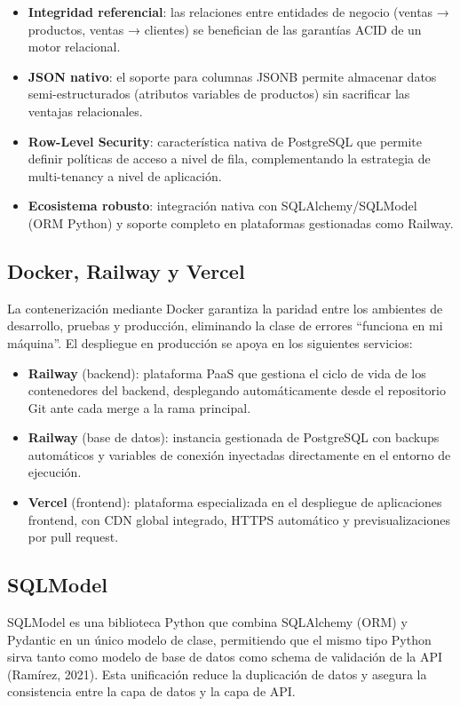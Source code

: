 \begin{itemize}
\tightlist
\item
  \textbf{Integridad referencial}: las relaciones entre entidades de negocio (ventas → productos, ventas → clientes) se benefician de las garantías ACID de un motor relacional.
\item
  \textbf{JSON nativo}: el soporte para columnas JSONB permite almacenar datos semi-estructurados (atributos variables de productos) sin sacrificar las ventajas relacionales.
\item
  \textbf{Row-Level Security}: característica nativa de PostgreSQL que permite definir políticas de acceso a nivel de fila, complementando la estrategia de multi-tenancy a nivel de aplicación.
\item
  \textbf{Ecosistema robusto}: integración nativa con SQLAlchemy/SQLModel (ORM Python) y soporte completo en plataformas gestionadas como Railway.
\end{itemize}

\subsection{Docker, Railway y Vercel}\label{docker-railway-y-vercel}

La contenerización mediante Docker garantiza la paridad entre los ambientes de desarrollo, pruebas y producción, eliminando la clase de errores ``funciona en mi máquina''. El despliegue en producción se apoya en los siguientes servicios:

\begin{itemize}
\tightlist
\item
  \textbf{Railway} (backend): plataforma PaaS que gestiona el ciclo de vida de los contenedores del backend, desplegando automáticamente desde el repositorio Git ante cada merge a la rama principal.
\item
  \textbf{Railway} (base de datos): instancia gestionada de PostgreSQL con backups automáticos y variables de conexión inyectadas directamente en el entorno de ejecución.
\item
  \textbf{Vercel} (frontend): plataforma especializada en el despliegue de aplicaciones frontend, con CDN global integrado, HTTPS automático y previsualizaciones por pull request.
\end{itemize}

\subsection{SQLModel}\label{sqlmodel}

SQLModel es una biblioteca Python que combina SQLAlchemy (ORM) y Pydantic en un único modelo de clase, permitiendo que el mismo tipo Python sirva tanto como modelo de base de datos como schema de validación de la API (Ramírez, 2021). Esta unificación reduce la duplicación de datos y asegura la consistencia entre la capa de datos y la capa de API.
